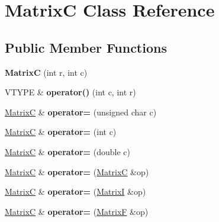 \hypertarget{class_matrix_c}{\section{Matrix\+C Class Reference}
\label{class_matrix_c}
}
\subsection*{Public Member Functions}
\begin{DoxyCompactItemize}
\item 
\hypertarget{class_matrix_c_a8ff603019b3659064a3cda9c9c260bba}{{\bfseries Matrix\+C} (int r, int c)}\label{class_matrix_c_a8ff603019b3659064a3cda9c9c260bba}

\item 
\hypertarget{class_matrix_c_a142fa8786d4cf3d9053d2cdb5d22e7eb}{V\+T\+Y\+P\+E \& {\bfseries operator()} (int c, int r)}\label{class_matrix_c_a142fa8786d4cf3d9053d2cdb5d22e7eb}

\item 
\hypertarget{class_matrix_c_af527715d5dc7a77f628dbebce80b6c50}{\hyperlink{class_matrix_c}{Matrix\+C} \& {\bfseries operator=} (unsigned char c)}\label{class_matrix_c_af527715d5dc7a77f628dbebce80b6c50}

\item 
\hypertarget{class_matrix_c_a7c90e94bb5714d718d55a91bd87fe721}{\hyperlink{class_matrix_c}{Matrix\+C} \& {\bfseries operator=} (int c)}\label{class_matrix_c_a7c90e94bb5714d718d55a91bd87fe721}

\item 
\hypertarget{class_matrix_c_a493949788a667b0902e083a4a7abc25d}{\hyperlink{class_matrix_c}{Matrix\+C} \& {\bfseries operator=} (double c)}\label{class_matrix_c_a493949788a667b0902e083a4a7abc25d}

\item 
\hypertarget{class_matrix_c_ab0503d007d73dbd3ba9dee7dcca31e0c}{\hyperlink{class_matrix_c}{Matrix\+C} \& {\bfseries operator=} (\hyperlink{class_matrix_c}{Matrix\+C} \&op)}\label{class_matrix_c_ab0503d007d73dbd3ba9dee7dcca31e0c}

\item 
\hypertarget{class_matrix_c_add40cadcd364c97ff585eb0626aeb427}{\hyperlink{class_matrix_c}{Matrix\+C} \& {\bfseries operator=} (\hyperlink{class_matrix_i}{Matrix\+I} \&op)}\label{class_matrix_c_add40cadcd364c97ff585eb0626aeb427}

\item 
\hypertarget{class_matrix_c_acf7e3e24cbe6707d1be508cc4af25a28}{\hyperlink{class_matrix_c}{Matrix\+C} \& {\bfseries operator=} (\hyperlink{class_matrix_f}{Matrix\+F} \&op)}\label{class_matrix_c_acf7e3e24cbe6707d1be508cc4af25a28}


\end{DoxyCompactItemize}
